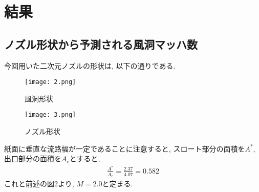\documentclass[12pt]{jsarticle}
\begin{document}
\section{結果}
\subsection{ノズル形状から予測される風洞マッハ数}
今回用いた二次元ノズルの形状は, 以下の通りである.
\begin{figure}[htbp]
 \begin{minipage}{0.5\hsize}
  \begin{center}
   \texttt{[image: 2.png]}
  \end{center}
  \caption{風洞形状}
  \label{fig:one}
 \end{minipage}
 \begin{minipage}{0.5\hsize}
  \begin{center}
   \texttt{[image: 3.png]}
  \end{center}
  \caption{ノズル形状}
  \label{fig:two}
 \end{minipage}
\end{figure}
\newline
紙面に垂直な流路幅が一定であることに注意すると, スロート部分の面積を$A^{\ast}$, 出口部分の面積を$A_e$とすると,
\begin{eqnarray*}
\frac{A^{\ast}}{A_e} = \frac{2.37}{4.07} = 0.582
\end{eqnarray*}
これと前述の図2より, \underline{$M=2.0$}と定まる.
\end{document}
